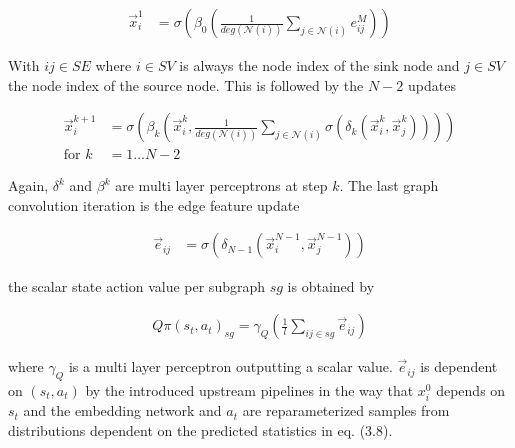 \begin{align}
\vec{x}_i^1 &= \sigma \left( \beta_0 \left(\frac{1}{deg(\mathcal{N}(i))} \sum_{j \in \mathcal{N}(i)}  e_{ij}^M\right)\right)
\end{align}

With $ij\in SE$ where $i \in SV$ is always the node index of the sink node and $j \in SV$ the node index of the source node.
This is followed by the $N-2$ updates

\begin{align}
\vec{x}_i^{k+1} &= \sigma \left( \beta_k \left(\vec{x}_i^k, \frac{1}{deg(\mathcal{N}(i))} \sum_{j \in \mathcal{N}(i)}  \sigma \left( \delta_k \left(\vec{x}_i^k, \vec{x}_j^k\right)\right) \right)\right)\\
\text{for }k&=1...N-2
\end{align}

Again, $\delta^k$ and $\beta^k$ are multi layer perceptrons at step $k$. The last graph convolution iteration is the edge feature update

\begin{align}
\vec{e}_{ij} &= \sigma \left( \delta_{N-1} \left(\vec{x}_i^{N-1}, \vec{x}_j^{N-1} \right)\right)
\end{align}

the scalar state action value per subgraph $sg$ is obtained by

\begin{align}
	Q\pi(s_t, a_t)_{sg} = \gamma_{Q}\left( \frac{1}{l} \sum_{ij\in sg} \vec{e}_{ij} \right)
\end{align}

where $\gamma_{Q}$ is a multi layer perceptron outputting a scalar value. $\vec{e}_{ij}$ is dependent on $(s_t, a_t)$ by the introduced upstream pipelines in the way that $x^0_i$ depends on $s_t$ and the embedding network and $a_t$ are reparameterized samples from distributions dependent on the predicted statistics in eq. (3.8).
